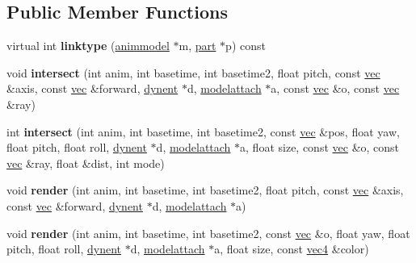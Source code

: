 \subsection*{Public Member Functions}
\begin{DoxyCompactItemize}
\item 
\mbox{\label{structanimmodel_a56b13dd7ec45bc5c07cd28e614a81982}} 
virtual int {\bfseries linktype} (\hyperlink{structanimmodel}{animmodel} $\ast$m, \hyperlink{structanimmodel_1_1part}{part} $\ast$p) const
\item 
\mbox{\label{structanimmodel_ae3359d512c6c6c34e32ed98e9b8a51e7}} 
void {\bfseries intersect} (int anim, int basetime, int basetime2, float pitch, const \hyperlink{structvec}{vec} \&axis, const \hyperlink{structvec}{vec} \&forward, \hyperlink{structdynent}{dynent} $\ast$d, \hyperlink{structmodelattach}{modelattach} $\ast$a, const \hyperlink{structvec}{vec} \&o, const \hyperlink{structvec}{vec} \&ray)
\item 
\mbox{\label{structanimmodel_a5bc10518c48616f2e1ee6eec4f2264a3}} 
int {\bfseries intersect} (int anim, int basetime, int basetime2, const \hyperlink{structvec}{vec} \&pos, float yaw, float pitch, float roll, \hyperlink{structdynent}{dynent} $\ast$d, \hyperlink{structmodelattach}{modelattach} $\ast$a, float size, const \hyperlink{structvec}{vec} \&o, const \hyperlink{structvec}{vec} \&ray, float \&dist, int mode)
\item 
\mbox{\label{structanimmodel_ac675f25eaaabe3c885dc56662b178036}} 
void {\bfseries render} (int anim, int basetime, int basetime2, float pitch, const \hyperlink{structvec}{vec} \&axis, const \hyperlink{structvec}{vec} \&forward, \hyperlink{structdynent}{dynent} $\ast$d, \hyperlink{structmodelattach}{modelattach} $\ast$a)
\item 
\mbox{\label{structanimmodel_a5e69cc0a64526b6b1abdcf1c14dfd3da}} 
void {\bfseries render} (int anim, int basetime, int basetime2, const \hyperlink{structvec}{vec} \&o, float yaw, float pitch, float roll, \hyperlink{structdynent}{dynent} $\ast$d, \hyperlink{structmodelattach}{modelattach} $\ast$a, float size, const \hyperlink{structvec4}{vec4} \&color)
\item 
\mbox{\label{structanimmodel_a4d6616ea5b740c69e9334aa87275753b}} 

\end{DoxyCompactItemize}
